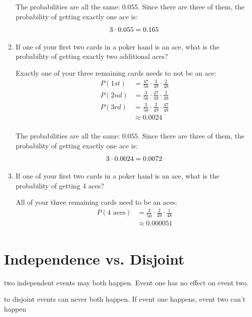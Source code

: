 \documentclass[letterpaper, landscape]{exam}
\begin{document}
\begin{enumerate}
\begin{solution}
        The probabilities are all the same: $0.055$. Since there are three of
        them, the probability of getting exactly one ace is: 
        \[
          3 \cdot 0.055 = 0.165 \\
        \]
      \end{solution}

    \item If one of your first two cards in a poker hand is an ace, what is the
      probability of getting exactly two additional aces?

      \begin{solution}
        Exactly one of your three remaining cards needs to not be an ace:
        \begin{align*}
          P(1st) & = \frac{47}{50} \cdot \frac{3}{49} \cdot \frac{2}{48} \\
          P(2nd) & = \frac{3}{50} \cdot \frac{47}{49} \cdot \frac{2}{48} \\
          P(3rd) & = \frac{3}{50} \cdot \frac{2}{49} \cdot \frac{47}{48} \\
                 & \approx 0.0024 \\
        \end{align*}

        The probabilities are all the same: $0.055$. Since there are three of
        them, the probability of getting exactly one ace is: 
        \[
          3 \cdot 0.0024 = 0.0072 \\
        \]
      \end{solution}

    \item If one of your first two cards in a poker hand is an ace, what is the
      probability of getting 4 aces?

      \begin{solution}
        All of your three remaining cards need to be an aces:
        \begin{align*}
          P(\text{4 aces}) & = \frac{3}{50} \cdot \frac{2}{49} \cdot \frac{1}{48} \\
                           & \approx \boxed{ 0.000051 } \\
        \end{align*}
      \end{solution}
  \end{enumerate}

  \section{Independence vs. Disjoint}
  \begin{itemize*}
    \item two independent events may both happen. Event one has no effect on
      event two.

    \item to disjoint events can never both happen. If event one happens, event
      two can't happen

  \end{itemize*}
\end{document}

